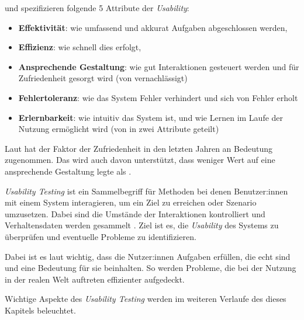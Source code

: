 \textcite{quesenberyDimensionsUsability2003} und \textcite{nielsenUsabilityEngineering1994}
spezifizieren folgende 5 Attribute der \textit{Usability}:
\begin{itemize}
  \item \textbf{Effektivität}: wie umfassend und akkurat Aufgaben abgeschlossen werden,
  \item \textbf{Effizienz}: wie schnell dies erfolgt,
  \item \textbf{Ansprechende Gestaltung}: wie gut Interaktionen gesteuert werden und für
        Zufriedenheit gesorgt wird (von \textcite{nielsenUsabilityEngineering1994} vernachlässigt)
  \item \textbf{Fehlertoleranz}: wie das System Fehler verhindert und sich von Fehler erholt
  \item \textbf{Erlernbarkeit}: wie intuitiv das System ist, und wie Lernen im Laufe der Nutzung
        ermöglicht wird (von \textcite{nielsenUsabilityEngineering1994} in zwei Attribute geteilt)
\end{itemize}
Laut \textcite{barnumUsabilityTesting2021} hat der Faktor der Zufriedenheit in den letzten Jahren an
Bedeutung zugenommen. Das wird auch davon unterstützt, dass
\textcite{nielsenUsabilityEngineering1994} weniger Wert auf eine ansprechende Gestaltung legte als
\textcite{quesenberyDimensionsUsability2003}.

\newpage

\textit{Usability Testing} ist ein Sammelbegriff für Methoden bei denen Benutzer:innen mit einem
System interagieren, um ein Ziel zu erreichen oder Szenario umzusetzen. Dabei sind die Umstände der
Interaktionen kontrolliert und Verhaltensdaten werden gesammelt
\parencite{wichanskyUsabilityTesting2000}. Ziel ist es, die \textit{Usability} des Systems zu
überprüfen und eventuelle Probleme zu identifizieren.

Dabei ist es laut \textcite{barnumUsabilityTesting2021} wichtig, dass die Nutzer:innen Aufgaben
erfüllen, die echt sind und eine Bedeutung für sie beinhalten. So werden Probleme, die bei der
Nutzung in der realen Welt auftreten effizienter aufgedeckt.

Wichtige Aspekte des \textit{Usability Testing} werden im weiteren Verlaufe des dieses Kapitels
beleuchtet.
